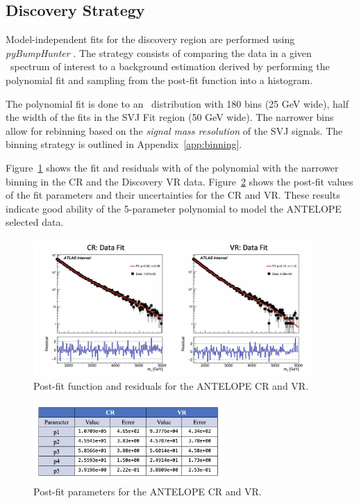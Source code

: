 \subsection{Discovery Strategy}
\label{subsec:fit_bh}

Model-independent fits for the discovery region are performed using \textit{pyBumpHunter} \cite{bumphunt}.
The strategy consists of comparing the data in a given \mt~spectrum of interest to a background estimation derived by performing the polynomial fit and sampling from the post-fit function into a histogram.

The polynomial fit is done to an \mt~distribution with 180 bins (25 GeV wide), half the width of the fits in the SVJ Fit region (50 GeV wide). %
The narrower bins allow for rebinning based on the \textit{signal mass resolution} of the SVJ signals.
The binning strategy is outlined in Appendix~\ref{app:binning}.

Figure~\ref{fig:bkgfit_data_crvr_antelope} shows the fit and residuals with of the polynomial with the narrower binning in the CR and the Discovery VR data.
Figure~\ref{fig:postfit_param_antelope} shows the post-fit values of the fit parameters and their uncertainties for the CR and VR. 
These results indicate good ability of the 5-parameter polynomial to model the ANTELOPE selected data.

\begin{figure}[!htbp]
\centering
   \includegraphics[width=0.95\textwidth]{figures/stats/bkgfit_data_crvr_antelope}
    \caption{Post-fit function and residuals for the ANTELOPE CR and VR.
    \label{fig:bkgfit_data_crvr_antelope}}
\end{figure}

\begin{figure}[!htbp]
\centering
   \includegraphics[width=0.65\textwidth]{figures/stats/postfit_param_antelope}
    \caption{Post-fit parameters for the ANTELOPE CR and VR.
    \label{fig:postfit_param_antelope}}
\end{figure}

